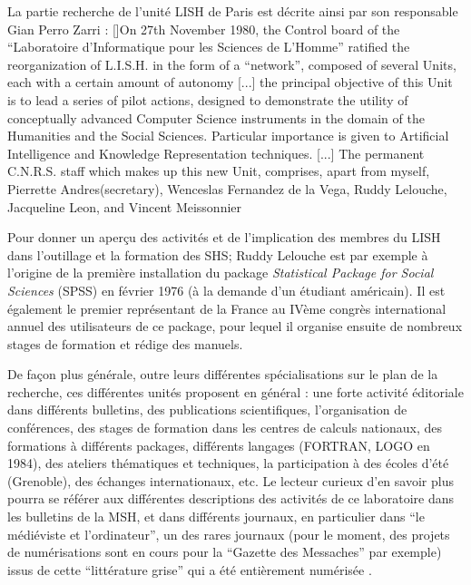 La partie recherche de l'unité LISH de Paris est décrite ainsi par son responsable Gian Perro Zarri : [\cite{Zarri1981}]{On 27th November 1980, the Control board of the \enquote{Laboratoire d'Informatique pour les Sciences de L'Homme} ratified the reorganization of L.I.S.H. in the form of a \enquote{network}, composed of several Units, each with a certain amount of autonomy [...] the principal objective of this Unit is to lead a series of pilot actions, designed to demonstrate the utility of conceptually advanced Computer Science instruments in the domain of the Humanities and the Social Sciences. Particular importance is given to Artificial Intelligence and Knowledge Representation techniques. [...]  The permanent C.N.R.S. staff which makes up this new Unit, comprises, apart from myself, Pierrette Andres(secretary), Wenceslas Fernandez de la Vega, Ruddy Lelouche, Jacqueline Leon, and Vincent Meissonnier}

Pour donner un aperçu des activités et de l'implication des membres du LISH dans l'outillage et la formation des SHS; Ruddy Lelouche est par exemple à l'origine de la première installation du package \textit{Statistical Package for Social Sciences} (SPSS) en février 1976 (à la demande d'un étudiant américain). Il est également le premier représentant de la France au IVème congrès international annuel des utilisateurs de ce package, pour lequel il organise ensuite de nombreux stages de formation et rédige des manuels.

De façon plus générale, outre leurs différentes spécialisations sur le plan de la recherche, ces différentes unités proposent en général : une forte activité éditoriale dans différents bulletins, des publications scientifiques, l'organisation de conférences, des stages de formation dans les centres de calculs nationaux, des formations à différents packages, différents langages (FORTRAN, LOGO en 1984), des ateliers thématiques et techniques, la participation à des écoles d'été (Grenoble), des échanges internationaux, etc. Le lecteur curieux d'en savoir plus pourra se référer aux différentes descriptions des activités de ce laboratoire dans les bulletins de la MSH, et dans différents journaux, en particulier dans \enquote{le médiéviste et l'ordinateur}, un des rares journaux (pour le moment, des projets de numérisations sont en cours pour la \enquote{Gazette des Messaches} par exemple) issus de cette \enquote{littérature grise} qui a été entièrement numérisée .

